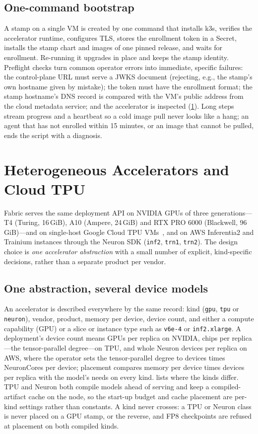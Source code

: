 \documentclass[conference,letterpaper]{IEEEtran}
\newcommand{\sys}{Fabric}
\newcommand{\code}[1]{\texttt{\small #1}}
\begin{document}
\subsection{One-command bootstrap}
\label{sec:bootstrap}
A stamp on a single VM is created by one command that installs k3s, verifies the accelerator
runtime, configures TLS, stores the enrollment token in a Secret, installs the stamp chart
and images of one pinned release, and waits for enrollment. Re-running it upgrades in place
and keeps the stamp identity. Preflight checks turn common operator errors into immediate,
specific failures: the control-plane URL must serve a JWKS document (rejecting, e.g., the
stamp's own hostname given by mistake); the token must have the enrollment format; the stamp
hostname's DNS record is compared with the VM's public address from the cloud metadata
service; and the accelerator is inspected (\cref{sec:accel}). Long steps stream progress and
a heartbeat so a cold image pull never looks like a hang; an agent that has not enrolled
within 15 minutes, or an image that cannot be pulled, ends the script with a diagnosis.

\section{Heterogeneous Accelerators and Cloud TPU}
\label{sec:accel}

\sys{} serves the same deployment API on NVIDIA GPUs of three generations---T4 (Turing,
16\,GiB), A10 (Ampere, 24\,GiB) and RTX PRO 6000 (Blackwell, 96\,GiB)---and on single-host
Google Cloud TPU VMs~\cite{tpu}, and on AWS Inferentia2 and Trainium instances through the Neuron
SDK (\code{inf2}, \code{trn1}, \code{trn2}). The design
choice is \emph{one accelerator abstraction} with a small number of explicit, kind-specific
decisions, rather than a separate product per vendor.

\subsection{One abstraction, several device models}
An accelerator is described everywhere by the same record: kind (\code{gpu}, \code{tpu} or \code{neuron}),
vendor, product, memory per device, device count, and either a compute capability (GPU) or a
slice or instance type such as \code{v6e-4} or \code{inf2.xlarge}. A deployment's device count
means GPUs per replica on NVIDIA, chips per replica---the tensor-parallel degree---on TPU, and
whole Neuron devices per replica on AWS, where the operator sets the tensor-parallel degree to
devices times NeuronCores per device; placement compares memory per device times devices per
replica with the model's needs on every kind.
 lists where the kinds differ. TPU and Neuron both compile models ahead of
serving and keep a compiled-artifact cache on the node, so the start-up budget and cache
placement are per-kind settings rather than constants. A kind never crosses: a TPU or Neuron
class is never placed on a GPU stamp, or the reverse, and FP8 checkpoints are refused at
placement on both compiled kinds.
\end{document}
